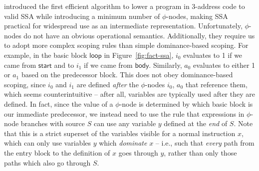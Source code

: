 \documentclass[acmsmall,screen,review]{acmart}
\newcommand{\ms}[1]{\ensuremath{\mathsf{#1}}}
\begin{document}
\citet{cytron-ssa-intro-91} introduced the first efficient algorithm to lower a program in 3-address
code to valid SSA while introducing a minimum number of $\phi$-nodes, making SSA practical for
widespread use as an intermediate representation. Unfortunately, $\phi$-nodes do not have an obvious
operational semantics. Additionally, they require us to adopt more complex scoping rules than simple
dominance-based scoping. For example, in the basic block \ms{loop} in Figure~\ref{fig:fact-ssa},
$i_0$ evaluates to 1 if we came from \ms{start} and to $i_1$ if we came from \ms{body}. Similarly,
$a_0$ evaluates to either 1 or $a_1$ based on the predecessor block. This does not obey
dominance-based scoping, since $i_0$ and $i_1$ are defined \emph{after} the $\phi$-nodes $i_0$,
$a_0$ that reference them, which seems counterintuitive -- after all, variables are typically used
after they are defined. In fact, since the value of a $\phi$-node is determined by which basic block
is our immediate predecessor, we instead need to use the rule that expressions in $\phi$-node
branches with source $S$ can use any variable $y$ defined at the \emph{end} of $S$. Note that this
is a strict superset of the variables visible for a normal instruction $x$, which can only use
variables $y$ which \emph{dominate} $x$ -- i.e., such that \emph{every} path from the entry block to
the definition of $x$ goes through $y$, rather than only those paths which also go through $S$.
\end{document}
